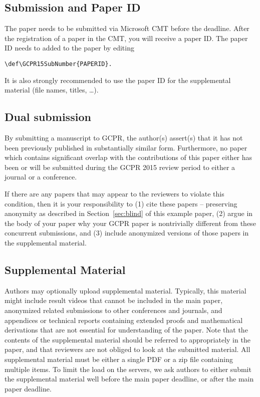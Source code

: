 \documentclass[runningheads]{llncs}
\begin{document}
	\subsection{Submission and Paper ID}
	The paper needs to be submitted via Microsoft CMT before the deadline.
	After the registration of a paper in the CMT, you will receive a paper ID.
	The paper ID needs to added to the paper by editing
	\begin{verbatim}
\def\GCPR15SubNumber{PAPERID}.
	\end{verbatim}
	It is also strongly recommended to use the paper ID for the supplemental material (file names, titles, \ldots).

	\subsection{Dual submission}
	\label{sec:dual}
	By submitting a manuscript to GCPR, the author(s) assert(s) that it has not been previously published in substantially similar form.
	Furthermore, no paper which contains significant overlap with the contributions of this paper either has been or will be submitted during the GCPR 2015 review period to either a journal or a conference.

	If there are any papers that may appear to the reviewers to violate this condition, then it is your responsibility to (1) cite these papers -- preserving anonymity as described in Section~\ref{sec:blind} of this example paper, (2) argue in the body of your paper why your GCPR paper is nontrivially different from these concurrent submissions, and (3) include anonymized versions of those papers in the supplemental material.

	\subsection{Supplemental Material}
	Authors may optionally upload supplemental material.
	Typically, this material might include result videos that cannot be included in the main paper, anonymized related submissions to other conferences and journals, and appendices or technical reports containing extended proofs and mathematical derivations that are not essential for understanding of the paper.
	Note that the contents of the supplemental material should be referred to appropriately in the paper, and that reviewers are not obliged to look at the submitted material.
	All supplemental material must be either a single PDF or a zip file containing multiple items.
	To limit the load on the servers, we ask authors to either submit the supplemental material well before the main paper deadline, or after the main paper deadline.
\end{document}
